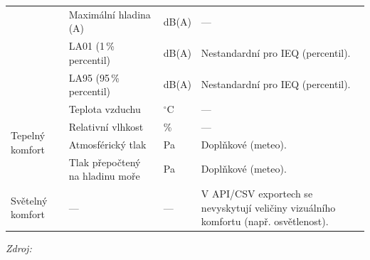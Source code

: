 \begin{table}[!tbp]
\begin{tabular}{p{2.8cm} p{5.8cm} p{1.7cm} >{\raggedright\arraybackslash}p{4.6cm}}
     & Maximální hladina (A) & dB(A) & ---\\
     & LA01 (1\,\% percentil) & dB(A) & Nestandardní pro IEQ (percentil).\\
     & LA95 (95\,\% percentil) & dB(A) & Nestandardní pro IEQ (percentil).\\
    \midrule
    \multirow{4}{*}{Tepelný komfort} & Teplota vzduchu & $^\circ$C & ---\\
     & Relativní vlhkost & \% & ---\\
     & Atmosférický tlak & Pa & Doplňkové (meteo).\\
     & Tlak přepočtený na hladinu moře & Pa & Doplňkové (meteo).\\
    \midrule
    \multirow{1}{*}{Světelný komfort} & --- & --- & V API/CSV exportech se nevyskytují veličiny vizuálního komfortu (např. osvětlenost).\\
    \bottomrule
  \end{tabular}

  \footnotesize \textit{Zdroj:} \parencite{Index, APIs}
\end{table}

